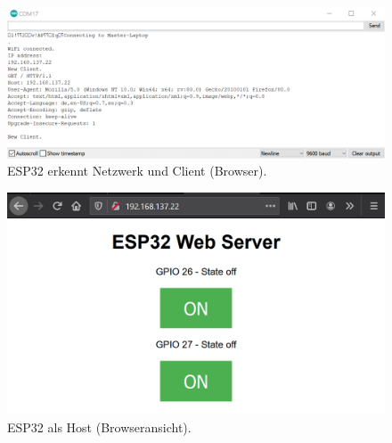 \begin{figure}[H]
	\centering
	\includegraphics[width=\textwidth]{graphics/ESP32_Serial_Monitor}
	\caption{ESP32 erkennt Netzwerk und Client (Browser).}
	\label{fig:ESP32_Serial_Monitor}
\end{figure}

\begin{figure}[H]
	\centering
	\includegraphics[width=\textwidth]{graphics/ESP32_Webserver}
	\caption{ESP32 als Host (Browseransicht).}
	\label{fig:ESP32_Webserver}
\end{figure}